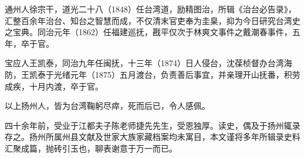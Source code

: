 \vfill
\begin{BookNotes}
\end{BookNotes}

通州人徐宗干，道光二十八（1848）任台湾道，励精图治，所辑《治台必告录》，汇整百余年治台、知台之智慧而成，不仅清末官吏奉为圭臬，抑为今日研究台湾史之宝典。同治元年（1862）任福建巡抚，戡平仅次于林爽文事件之戴潮春事件，五年，卒于官。

宝应人王凯泰，同治九年任闽抚，十三年（1874）日人侵台，沈葆桢督办台湾海防，王凯泰于光绪元年（1875）五月渡台，负责善后事宜，并亲理开山抚番，积劳成疾，十月内渡，卒于官。

以上扬州人，皆为台湾鞠躬尽瘁，死而后已，令人感佩。

四十余年前，受业于江都夫子陈老师捷先先生，受恩独厚。读史，偶及于扬州辄录存之。扬州所属州县文献及世家大族家藏档案均未寓目，本文谨将多年所辑录史料汇聚成篇，抛砖引玉也，聊表谢意于万一而已。
